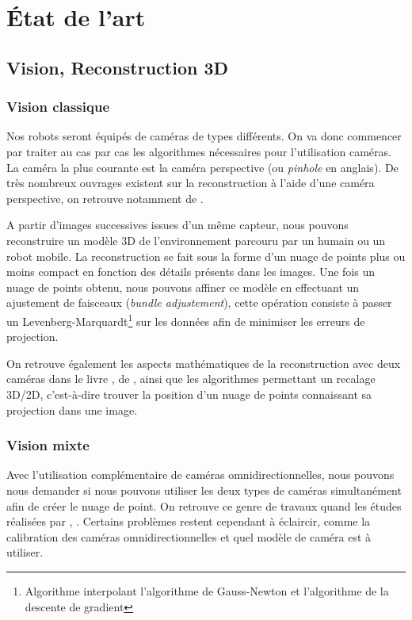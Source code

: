 \section{État de l'art}
\label{sec:etatart}

\subsection{Vision, Reconstruction 3D}

\subsubsection{Vision classique}

Nos robots seront équipés de caméras de types différents.
On va donc commencer par traiter au cas par cas les algorithmes nécessaires pour l'utilisation caméras.
La caméra la plus courante est la caméra perspective (ou \textit{pinhole} en anglais).
De très nombreux ouvrages existent sur la reconstruction à l'aide d'une caméra perspective, on retrouve notamment   de \citeauthor{Hartley03Book} \cite{Hartley03Book}.

A partir d'images successives issues d'un même capteur, nous pouvons reconstruire un modèle 3D de l'environnement parcouru par un humain ou un robot mobile.
La reconstruction se fait sous la forme d'un nuage de points plus ou moins compact en fonction des détails présents dans les images.
Une fois un nuage de points obtenu, nous pouvons affiner ce modèle en effectuant un ajustement de faisceaux (\textit{bundle adjustement}), cette opération consiste à passer un Levenberg-Marquardt\footnote{Algorithme interpolant l'algorithme de Gauss-Newton et l'algorithme de la descente de gradient} sur les données afin de minimiser les erreurs de projection.

On retrouve également les aspects mathématiques de la reconstruction avec deux caméras dans le livre \cite{HoraudBook},  de \citeauthor{HoraudBook}, ainsi que les algorithmes permettant un recalage 3D/2D, c’est-à-dire trouver la position d'un nuage de points connaissant sa projection dans une image.

\subsubsection{Vision mixte}

Avec l'utilisation complémentaire de caméras omnidirectionnelles, nous pouvons nous demander si nous pouvons utiliser les deux types de caméras simultanément afin de créer le nuage de point.
On retrouve ce genre de travaux quand les études réalisées par
\citeauthor{Sturm02},  \cite{Sturm02}.
Certains problèmes restent cependant à éclaircir, comme la calibration des caméras omnidirectionnelles et quel modèle de caméra est à utiliser.

